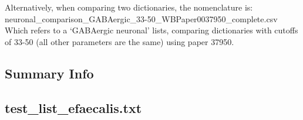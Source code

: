 \documentclass{article}
\begin{document}
Alternatively, when comparing two dictionaries, the nomenclature is:
neuronal\_comparison\_GABAergic\_33-50\_WBPaper0037950\_complete.csv
Which refers to a `GABAergic neuronal' lists, comparing dictionaries with cutoffs of 33-50 (all other parameters are the same) using paper 37950. 

\subsection*{Summary Info}

\subsection*{test\_list\_efaecalis.txt}



\end{document}
